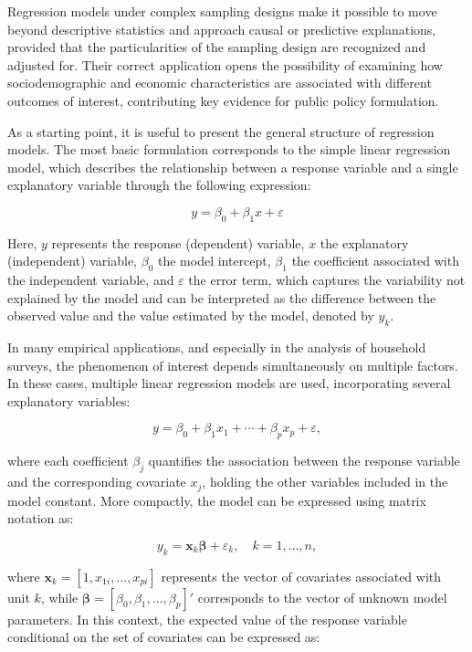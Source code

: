 \documentclass[
  english,
  12pt,
]{book}
\begin{document}
Regression models under complex sampling designs make it possible to move beyond descriptive statistics and approach causal or predictive explanations, provided that the particularities of the sampling design are recognized and adjusted for. Their correct application opens the possibility of examining how sociodemographic and economic characteristics are associated with different outcomes of interest, contributing key evidence for public policy formulation.

As a starting point, it is useful to present the general structure of regression models. The most basic formulation corresponds to the simple linear regression model, which describes the relationship between a response variable and a single explanatory variable through the following expression:

\[
y = \beta_{0} + \beta_{1}x + \varepsilon
\]

Here, \(y\) represents the response (dependent) variable, \(x\) the explanatory (independent) variable, \(\beta_{0}\) the model intercept, \(\beta_{1}\) the coefficient associated with the independent variable, and \(\varepsilon\) the error term, which captures the variability not explained by the model and can be interpreted as the difference between the observed value and the value estimated by the model, denoted by \(\hat{y}_k\).

In many empirical applications, and especially in the analysis of household surveys, the phenomenon of interest depends simultaneously on multiple factors. In these cases, multiple linear regression models are used, incorporating several explanatory variables:

\[
y = \beta_{0} + \beta_{1}x_{1} + \cdots + \beta_{p}x_{p} + \varepsilon,
\]

where each coefficient \(\beta_{j}\) quantifies the association between the response variable and the corresponding covariate \(x_{j}\), holding the other variables included in the model constant. More compactly, the model can be expressed using matrix notation as:

\[
y_{k} = \mathbf{x}_{k}\boldsymbol{\beta} + \varepsilon_{k}, \quad k=1,\ldots,n,
\]

where \(\mathbf{x}_{k} = [1, x_{1i}, \ldots, x_{pi}]\) represents the vector of covariates associated with unit \(k\), while \(\boldsymbol{\beta} = [\beta_{0}, \beta_{1}, \ldots, \beta_{p}]'\) corresponds to the vector of unknown model parameters. In this context, the expected value of the response variable conditional on the set of covariates can be expressed as:
\end{document}
